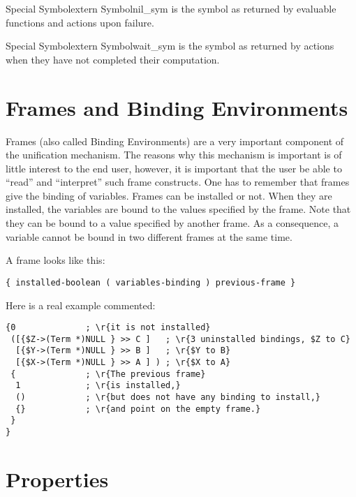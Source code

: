 \begin{typevr}{Special Symbol}{extern Symbol}{nil\_sym}
is the  symbol as returned by evaluable functions and actions upon
failure.  
\end{typevr}

\begin{typevr}{Special Symbol}{extern Symbol}{wait\_sym}
is the  symbol as returned by actions when they have not completed
their computation. 
\end{typevr}

\section{Frames and Binding Environments}

Frames (also called Binding Environments) are a very important component of the
unification mechanism. The reasons why this mechanism is important is of little
interest to the end user, however, it is important that the user be able to
``read'' and ``interpret'' such frame constructs. One has to remember that
frames give the binding of variables. Frames can be installed or not. When they
are installed, the variables are bound to the values specified by the frame.
Note that they can be bound to a value specified by another frame. As a
consequence, a variable cannot be bound in two different frames at the same
time.

A frame looks like this:
\begin{verbatim}
{ installed-boolean ( variables-binding ) previous-frame }
\end{verbatim}

Here is a real example commented:

\begin{verbatim}
{0              ; \r{it is not installed}
 ([{$Z->(Term *)NULL } >> C ]   ; \r{3 uninstalled bindings, $Z to C}
  [{$Y->(Term *)NULL } >> B ]   ; \r{$Y to B}
  [{$X->(Term *)NULL } >> A ] ) ; \r{$X to A}
 {              ; \r{The previous frame}
  1             ; \r{is installed,}
  ()            ; \r{but does not have any binding to install,}
  {}            ; \r{and point on the empty frame.}
 }
}
\end{verbatim}

\section{Properties}

